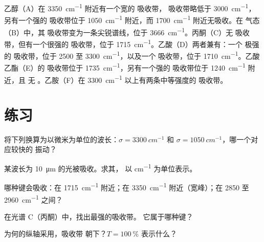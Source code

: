 \begin{example}[读取六种光谱]\label{ex:g11:infrared:six}
乙醇（A）在 \qty{3350}{cm^{-1}} 附近有一个宽的  吸收带，
 吸收带略低于 \qty{3000}{cm^{-1}}，另有一个强的 
吸收带位于 \qty{1050}{cm^{-1}} 附近，而 \qty{1700}{cm^{-1}} 附近无吸收。在
气态（B）中，其  吸收带变为一条尖锐谱线，位于
\qty{3666}{cm^{-1}}。丙酮（C）无  吸收带，但有一个很强的
 吸收带，位于 \qty{1715}{cm^{-1}}。乙酸（D）两者兼有：一个
极强的  吸收带，位于 2500 至 \qty{3300}{cm^{-1}}，以及一个 
吸收带，位于 \qty{1710}{cm^{-1}}。乙酸乙酯（E）的  吸收带位于
\qty{1735}{cm^{-1}}，另有一个强的  吸收带位于 \qty{1240}{cm^{-1}} 附近，且
无 。乙胺（F）在
\qty{3300}{cm^{-1}} 以上有两条中等强度的  吸收带。
\end{example}

\section{练习}

\begin{exercise}[$\star$]\label{exo:g11:infrared:1}
将下列换算为以微米为单位的波长：$\sigma = \qty{3300}{cm^{-1}}$
和 $\sigma = \qty{1050}{cm^{-1}}$，哪一个对应较快的
振动？
\end{exercise}

\begin{exercise}[$\star$]\label{exo:g11:infrared:2}
某波长为 \qty{10}{\micro m} 的光被吸收。求其，
以 \si{cm^{-1}} 为单位表示。
\end{exercise}

\begin{exercise}[$\star$]\label{exo:g11:infrared:3}
哪种键会吸收：在 \qty{1715}{cm^{-1}} 附近；在 \qty{3350}{cm^{-1}}
附近（宽峰）；在 2850 至 \qty{2960}{cm^{-1}} 之间？
\end{exercise}

\begin{exercise}[$\star$]\label{exo:g11:infrared:4}
在光谱 C（丙酮）中，找出最强的吸收带。
它属于哪种键？
\end{exercise}

\begin{exercise}[$\star$]\label{exo:g11:infrared:5}
为何的纵轴采用，吸收带
朝下？$T = \qty{100}{\percent}$ 表示什么？
\end{exercise}

